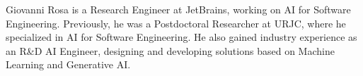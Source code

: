 Giovanni Rosa is a Research Engineer at JetBrains, working on AI for Software Engineering. Previously, he was a Postdoctoral Researcher at URJC, where he specialized in AI for Software Engineering. He also gained industry experience as an R\&D AI Engineer, designing and developing solutions based on Machine Learning and Generative AI.